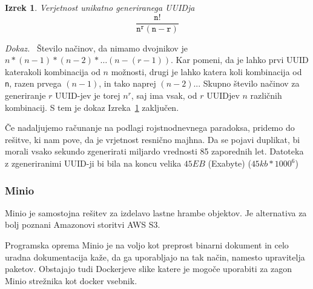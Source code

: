 \documentclass[a4paper, 12pt]{book}
\newtheorem{izrek}{Izrek}[chapter]
\newenvironment{dokaz}{\emph{Dokaz.}\ }{\hspace{\fill}{$\Box$}}
\begin{document}
\begin{izrek}
\label{iz:1}
Verjetnost unikatno generiranega UUIDja
\begin{equation}
\mathtt{\frac{n!}{n^{r}(n-r)}}
\label{eq:1}
\end{equation}
\end{izrek}

\begin{dokaz}
Število načinov, da nimamo dvojnikov je $n*(n-1)*(n-2)* …(n-(r-1))$. Kar pomeni, da je lahko prvi UUID katerakoli kombinacija od $n$ možnosti, drugi je lahko katera koli kombinacija od \verb=n=, razen prvega $(n-1)$, in tako naprej $(n-2)$... Skupno število načinov za generiranje $r$ UUID-jev je torej $n^r$, saj ima vsak, od $r$ UUIDjev $n$ različnih kombinacij.
S tem je dokaz Izreka~\ref{iz:1} zaključen.
\end{dokaz}

Če nadaljujemo računanje na podlagi rojstnodnevnega paradoksa, pridemo do rešitve, ki nam pove, da je vrjetnost resnično majhna. Da se pojavi duplikat, bi morali vsako sekundo zgenerirati miljardo vrednosti 85 zaporednih let. Datoteka z zgeneriranimi UUID-ji bi bila na koncu velika $45EB$ (Exabyte) ($45kb*1000^6$) \cite{uuid-collisions}






\subsubsection{Minio}
\label{minio-what}
Minio je samostojna rešitev za izdelavo lastne hrambe objektov. Je alternativa za bolj poznani Amazonovi storitvi AWS S3.

Programska oprema Minio je na voljo kot preprost binarni dokument in celo uradna dokumentacija kaže, da ga uporabljajo na tak način, namesto upravitelja paketov. Obstajajo tudi Dockerjeve slike katere je mogoče uporabiti za zagon Minio strežnika kot docker vsebnik.
\end{document}
